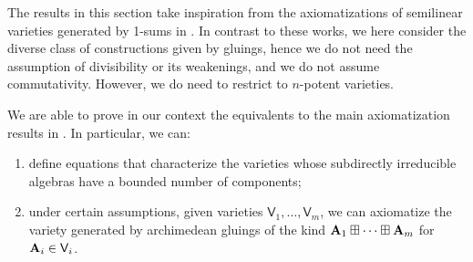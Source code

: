\documentclass{amsart}
\theoremstyle{definition}
\numberwithin{equation}{section}
\newcommand{\alg}[1]{{\textbf{\upshape #1}}}  %
\newcommand{\vv}[1]{\mathsf {#1}}
\begin{document}
The results in this section take inspiration from the axiomatizations of semilinear varieties generated by 1-sums in \cite{AM2003,GalatosUgolinimanuscript}. In contrast to these works, we here consider the diverse class of constructions given by gluings, hence we do not need the assumption of divisibility or its weakenings, and we do not assume commutativity. However, we do need to restrict to $n$-potent varieties.

We are able to prove in our context the equivalents to the main axiomatization results in \cite{AM2003,GalatosUgolinimanuscript}. In particular, we can:
\begin{enumerate}
	\item define equations that characterize the varieties whose subdirectly irreducible algebras have a bounded number of components;
	\item under certain assumptions, given varieties $\vv V_1, \ldots, \vv V_m$, we can axiomatize the variety generated by archimedean gluings of the kind $\alg A_1 \boxplus \dots \boxplus \alg A_m$ for $\alg A_i\in \vv V_i$.
\end{enumerate} 
\end{document}
